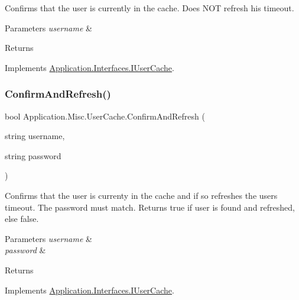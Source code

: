 Confirms that the user is currently in the cache. Does N\+OT refresh his timeout. 


\begin{DoxyParams}{Parameters}
{\em username} & \\
\hline
\end{DoxyParams}
\begin{DoxyReturn}{Returns}

\end{DoxyReturn}


Implements \mbox{\hyperlink{interface_application_1_1_interfaces_1_1_i_user_cache_a4978aad56d7292eafa02e8e7ad66f2c2}{Application.\+Interfaces.\+I\+User\+Cache}}.

\mbox{\label{class_application_1_1_misc_1_1_user_cache_ad11a0422af31b1492098415d8e4aaad8}} 
\subsubsection{\texorpdfstring{Confirm\+And\+Refresh()}{ConfirmAndRefresh()}}
{\footnotesize\ttfamily bool Application.\+Misc.\+User\+Cache.\+Confirm\+And\+Refresh (\begin{DoxyParamCaption}\item[{string}]{username,  }\item[{string}]{password }\end{DoxyParamCaption})}



Confirms that the user is currenty in the cache and if so refreshes the user\textquotesingle{}s timeout. The password must match. Returns true if user is found and refreshed, else false. 


\begin{DoxyParams}{Parameters}
{\em username} & \\
\hline
{\em password} & \\
\hline
\end{DoxyParams}
\begin{DoxyReturn}{Returns}

\end{DoxyReturn}


Implements \mbox{\hyperlink{interface_application_1_1_interfaces_1_1_i_user_cache_a3516a7abf1f40f9ddd10243cad03bb65}{Application.\+Interfaces.\+I\+User\+Cache}}.

